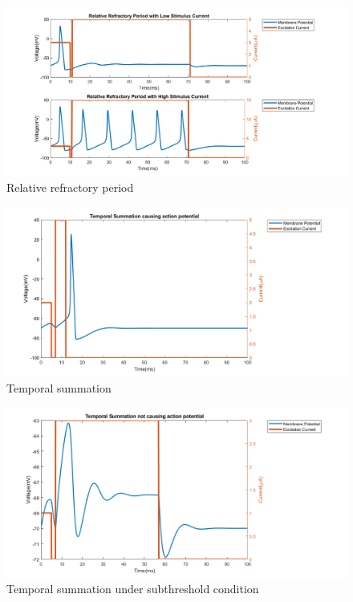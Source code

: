 \documentclass{IEEEtran}
\begin{document}
\begin{figure}[h]
\centering
\includegraphics[width=\textwidth]{Fig6.png}
\caption{Relative refractory period}\label{fig:rrp}
\end{figure}
\begin{figure}[h]
\centering
\includegraphics[width=\textwidth]{Fig1.png}
\caption{Temporal summation}\label{fig:tempsum}
\end{figure}
\begin{figure}[h]
\centering
\includegraphics[width=\textwidth]{ts_not.png}
\caption{Temporal summation under subthreshold condition}\label{fig:ts_not}
\end{figure}
\end{document}
